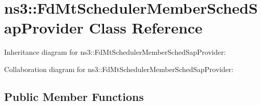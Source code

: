 \hypertarget{classns3_1_1FdMtSchedulerMemberSchedSapProvider}{}\section{ns3\+:\+:Fd\+Mt\+Scheduler\+Member\+Sched\+Sap\+Provider Class Reference}
\label{classns3_1_1FdMtSchedulerMemberSchedSapProvider}


Inheritance diagram for ns3\+:\+:Fd\+Mt\+Scheduler\+Member\+Sched\+Sap\+Provider\+:


Collaboration diagram for ns3\+:\+:Fd\+Mt\+Scheduler\+Member\+Sched\+Sap\+Provider\+:
\subsection*{Public Member Functions}
